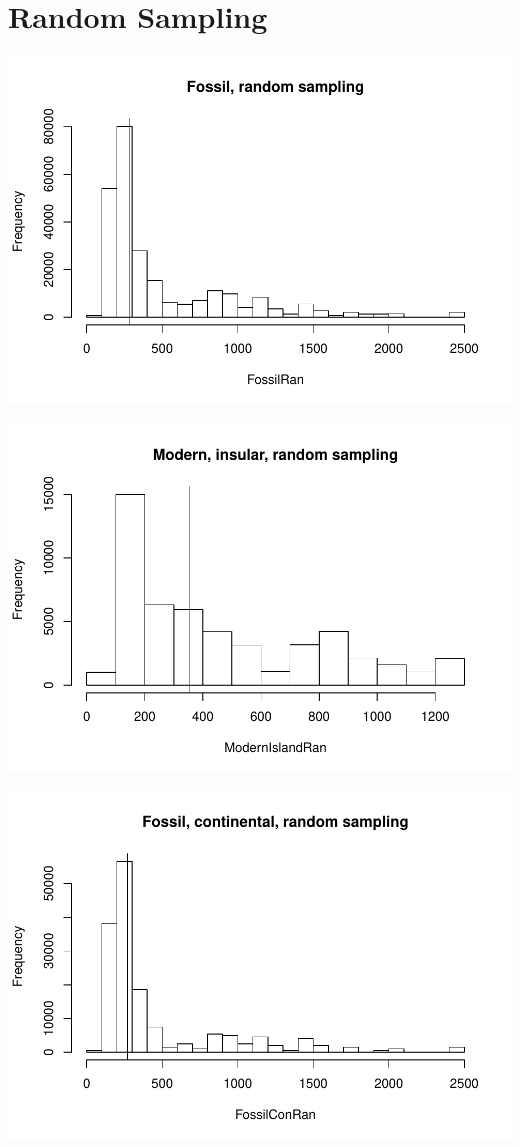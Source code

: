 \section{Random Sampling}


\includegraphics{MA_JJ_files/figure-latex/RSFM-1.pdf}


\includegraphics{MA_JJ_files/figure-latex/RSMFCI-1.pdf}


\includegraphics{MA_JJ_files/figure-latex/RSMFCI-2.pdf}



